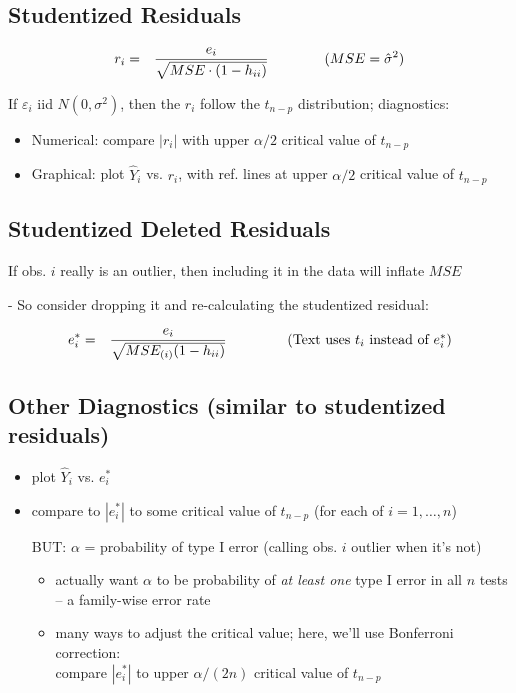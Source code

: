 \documentclass[12pt]{notes}
\begin{document}
\subsection{Studentized Residuals}
\begin{eqnarray}
r_i & = & \frac{e_i}{\sqrt{MSE \cdot (1-h_{ii})}}  \mbox{\hspace{4em}} (MSE = \hat{\sigma}^2) \nonumber
\end{eqnarray}

If $\varepsilon_i$ iid $N(0,\sigma^2)$, then the $r_i$ follow the $t_{n-p}$ distribution; diagnostics:
\begin{itemize}
  \item Numerical: compare $|r_i|$ with upper $\alpha/2$ critical value of $t_{n-p}$
  \item Graphical: plot $\hat{Y}_i$ vs. $r_i$, with ref. lines at upper $\alpha/2$ critical value of $t_{n-p}$
\end{itemize}

\subsection{Studentized Deleted Residuals}
If obs. $i$ really is an outlier, then including it in the data will inflate $MSE$

 - So consider dropping it and re-calculating the studentized residual:

\begin{eqnarray}
e^*_i & = & \frac{e_i}{\sqrt{MSE_{(i)} (1-h_{ii})}} \mbox{\hspace{4em} (Text uses $t_i$ instead of $e^*_i$)} \nonumber
\end{eqnarray}

\subsection{Other Diagnostics (similar to studentized residuals)}
\begin{itemize}
  \item plot $\hat{Y}_i$ vs. $e^*_i$
  \item compare to $|e^*_i|$ to some critical value of $t_{n-p}$  (for each of $i=1,\ldots,n$)\\

\vspace{-.5em}

   BUT:  $\alpha$ = probability of type I error (calling obs. $i$ outlier when it's not)
    \begin{itemize}
      \item actually want $\alpha$ to be probability of {\it at least one} type I error in all $n$ tests\\
        -- a family-wise error rate
      \item many ways to adjust the critical value; here,  we'll use Bonferroni correction:\\

      compare $|e^*_i|$ to upper $\alpha/(2 n)$ critical value of $t_{n-p}$
    \end{itemize}

\end{itemize}
\end{document}
